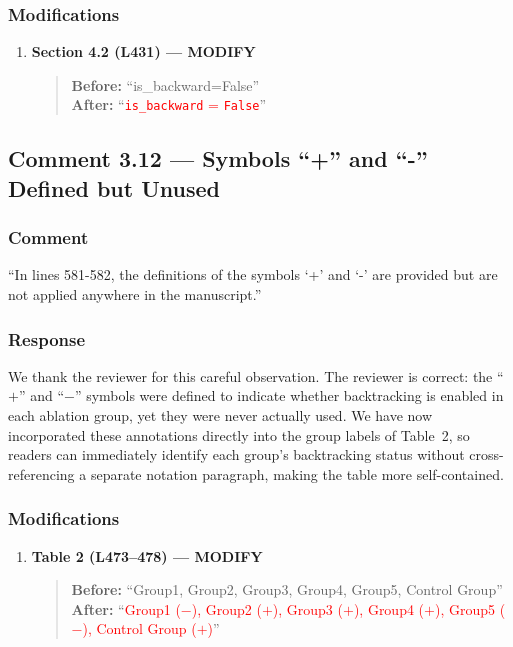\documentclass[11pt,a4paper]{article}
\begin{document}
\subsubsection{Modifications}
\begin{enumerate}
\item \textbf{Section 4.2 (L431) --- MODIFY}
\begin{quote}
\textbf{Before:} ``is\_backward=False''\\[4pt]
\textbf{After:} ``\textcolor{red}{\texttt{is\_backward} = \texttt{False}}''
\end{quote}
\end{enumerate}

\subsection{Comment 3.12 --- Symbols ``+'' and ``-'' Defined but Unused}

\subsubsection{Comment}
``In lines 581-582, the definitions of the symbols `+' and `-' are provided but are not applied anywhere in the manuscript.''

\subsubsection{Response}
We thank the reviewer for this careful observation.
The reviewer is correct: the ``$+$'' and ``$-$'' symbols were defined to indicate whether backtracking is enabled in each ablation group, yet they were never actually used.
We have now incorporated these annotations directly into the group labels of Table~2, so readers can immediately identify each group's backtracking status without cross-referencing a separate notation paragraph, making the table more self-contained.

\subsubsection{Modifications}

\begin{enumerate}
\item \textbf{Table 2 (L473--478) --- MODIFY}
\begin{quote}
\textbf{Before:} ``Group1, Group2, Group3, Group4, Group5, Control Group''\\[4pt]
\textbf{After:} ``\textcolor{red}{Group1 ($-$), Group2 ($+$), Group3 ($+$), Group4 ($+$), Group5 ($-$), Control Group ($+$)}''
\end{quote}
\end{enumerate}
\end{document}
